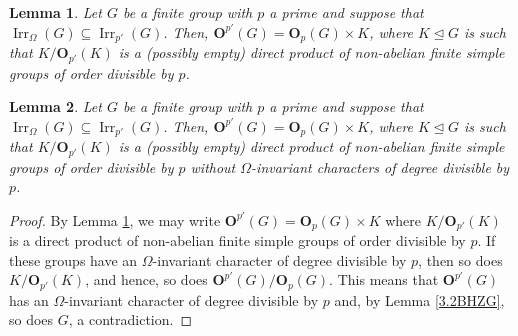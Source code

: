 \documentclass[10pt,a4paper]{amsart}
\newtheorem{lem}{Lemma}
\newcommand{\Irr}{{\operatorname{Irr}}}
\newcommand{\bO}{{\mathbf O}}
\begin{document}
	\begin{lem}
		\label{Part1}
		Let $G$ be a finite group with $p$ a prime and suppose that $\Irr_{\Omega}(G) \subseteq \Irr_{p'}(G)$. Then, $\bO^{p'}(G) = \bO_p(G) \times K$, where $K \unlhd G$ is such that $K/\bO_{p'}(K)$ is a (possibly empty) direct product of non-abelian finite simple groups of order divisible by $p$.
	\end{lem}

	\begin{lem}
		\label{Part2}
		Let $G$ be a finite group with $p$ a prime and suppose that $\Irr_{\Omega}(G) \subseteq \Irr_{p'}(G)$. Then, $\bO^{p'}(G) = \bO_p(G) \times K$, where $K \unlhd G$ is such that $K/\bO_{p'}(K)$ is a (possibly empty) direct product of non-abelian finite simple groups of order divisible by $p$ without $\Omega$-invariant characters of degree divisible by $p$.
	\end{lem}

	\begin{proof}
		By Lemma \ref{Part1}, we may write $\bO^{p'}(G) = \bO_p(G) \times K$ where $K/\bO_{p'}(K)$ is a direct product of non-abelian finite simple groups of order divisible by $p$. If these groups have an $\Omega$-invariant character of degree divisible by $p$, then so does $K/\bO_{p'}(K)$, and hence, so does $\bO^{p'}(G)/\bO_p(G)$. This means that $\bO^{p'}(G)$ has an $\Omega$-invariant character of degree divisible by $p$ and, by Lemma \ref{3.2BHZG}, so does $G$, a contradiction.
	\end{proof}
\end{document}
